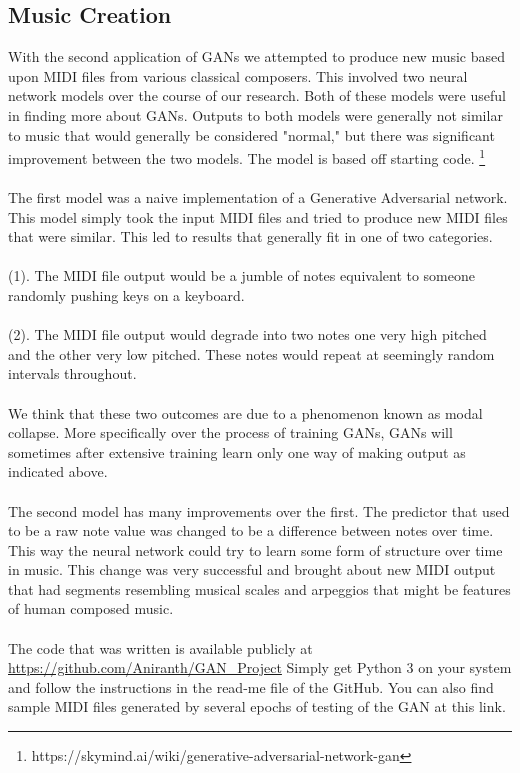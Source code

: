 \documentclass[12pt]{amsart}
\theoremstyle{definition}
\theoremstyle{remark}
\begin{document}
\subsection{Music Creation}
With the second application of GANs we attempted to produce new music based upon 
MIDI files from various classical composers. This involved two neural network models
over the course of our research. Both of these models were useful in finding more about GANs.
Outputs to both models were generally not similar to music that would generally be considered "normal,"
but there was significant improvement between the two models. The model is based off starting code.
\footnote{https://skymind.ai/wiki/generative-adversarial-network-gan}
\\\\
The first model was a naive implementation of a Generative Adversarial network. This model simply took the
input MIDI files and tried to produce new MIDI files that were similar. This led to results that generally fit in one
of two categories.
\\\\
(1). The MIDI file output would be a jumble of notes equivalent to someone randomly pushing 
keys on a keyboard. 
\\\\
(2). The MIDI file output would degrade into two notes one very high pitched and the other very low
pitched. These notes would repeat at seemingly random intervals throughout.
\\\\
We think that these two outcomes are due to a phenomenon known as modal collapse. More specifically over the process
of training GANs, GANs will sometimes after extensive training learn only one way of making output as indicated above.
\\\\
The second model has many improvements over the first. The predictor that used to be a raw note value
was changed to be a difference between notes over time. This way the neural network could try to learn
some form of structure over time in music. This change was very successful and brought about new MIDI
output that had segments resembling musical scales and arpeggios that might be features of human composed music.
\\\\
The code that was written is available publicly at 
\href{https://github.com/Aniranth/GAN_Project}{https://github.com/Aniranth/GAN\_Project}
Simply get Python 3 on your system and follow the instructions in the read-me file of the GitHub.  You can also find sample MIDI files generated by several epochs of testing of the GAN at this link.
\end{document}
